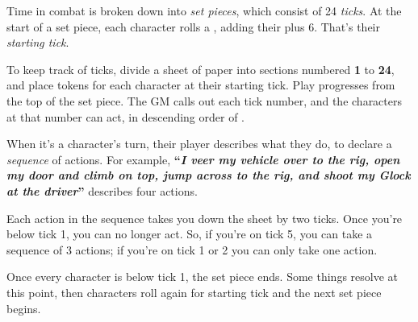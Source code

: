 
Time in combat is broken down into \emph{set pieces}, which consist of 24 \emph{ticks}. At the start of a set piece, each character rolls a , adding their  plus 6. That's their \emph{starting tick}.

To keep track of ticks, divide a sheet of paper into sections numbered \textbf{1} to \textbf{24}, and place tokens for each character at their starting tick. Play progresses from the top of the set piece. The GM calls out each tick number, and the characters at that number can act, in descending order of .

When it's a character's turn, their player describes what they do, to declare a \emph{sequence} of actions. For example, \textbf{``\emph{I veer my vehicle over to the rig, open my door and climb on top, jump across to the rig, and shoot my Glock at the driver}''} describes four actions.

Each action in the sequence takes you down the sheet by two ticks. Once you're below tick 1, you can no longer act. So, if you're on tick 5, you can take a sequence of 3 actions; if you're on tick 1 or 2 you can only take one action.

Once every character is below tick 1, the set piece ends. Some things resolve at this point, then characters roll again for starting tick and the next set piece begins.
